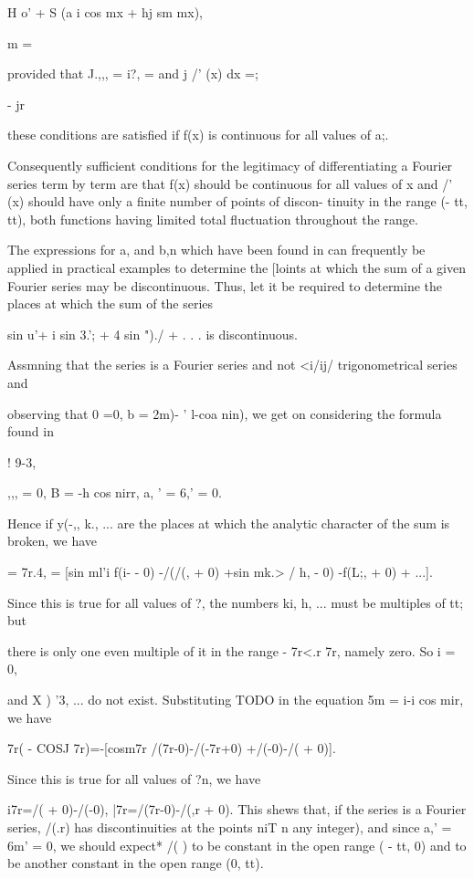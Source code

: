 H o' + S (a i cos mx + hj sm mx),

  m = \

provided that J.,,, = i?, = and j /' (x) dx =;

- jr

these conditions are satisfied if f(x) is continuous for all values of
a;.

Consequently sufficient conditions for the legitimacy of
differentiating a Fourier series term by term are that f(x) should be
continuous for all values of x and /' (x) should have only a finite
number of points of discon- tinuity in the range (- tt, tt), both
functions having limited total fluctuation throughout the range.


The expressions for a, and b,n which have been found in can
frequently be applied in practical examples to determine the [loints
at which the sum of a given Fourier series may be discontinuous. Thus,
let it be required to determine the places at which the sum of the
series

sin u'+ i sin 3.'; + 4 sin ")./ + . . . is discontinuous.

  Assmning that the series is a Fourier series and not <i/ij/
trigonometrical series and

observing that 0 =0, b = 2m)- ' l-coa nin), we get on considering the
formula found in

! 9-3,

,,, = 0, B = -h cos nirr, a, ' = 6,' = 0.

Hence if y(-,, k., ... are the places at which the analytic
character of the sum is broken, we have

= 7r.4, = [sin ml'i f(i- - 0) -/(/(, + 0) +sin mk.> / h, - 0) -f(L;,
+ 0) + ...].

Since this is true for all values of ?, the numbers ki, h, ... must
be multiples of tt; but

there is only one even multiple of it in the range - 7r<.r 7r, namely
zero. So i = 0,

and X ) '3, ... do not exist. Substituting TODO in the equation 5m =
i-i cos mir, we have

7r( - COSJ 7r)=-[cosm7r /(7r-0)-/(-7r+0) +/(-0)-/( + 0)].

Since this is true for all values of ?n, we have

i7r=/( + 0)-/(-0), |7r=/(7r-0)-/(,r + 0). This shews that, if the
series is a Fourier series, /(.r) has discontinuities at the points
niT n any integer), and since a,' = 6m' = 0, we should expect* /( )
to be constant in the open range ( - tt, 0) and to be another constant
in the open range (0, tt).

